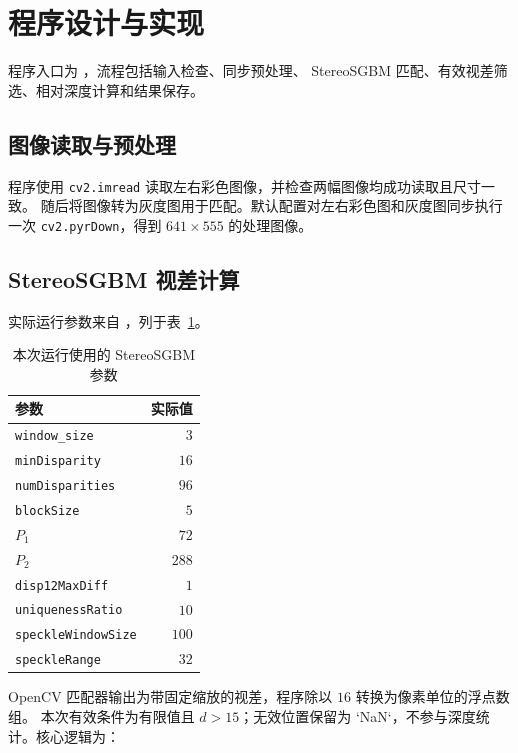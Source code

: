 \section{程序设计与实现}

程序入口为 ，流程包括输入检查、同步预处理、
StereoSGBM 匹配、有效视差筛选、相对深度计算和结果保存。

\subsection{图像读取与预处理}

程序使用 \texttt{cv2.imread} 读取左右彩色图像，并检查两幅图像均成功读取且尺寸一致。
随后将图像转为灰度图用于匹配。默认配置对左右彩色图和灰度图同步执行一次
\texttt{cv2.pyrDown}，得到 $641\times555$ 的处理图像。

\subsection{StereoSGBM 视差计算}

实际运行参数来自 ，列于表~\ref{tab:sgbm-params}。

\begin{table}[H]
  \centering
  \caption{本次运行使用的 StereoSGBM 参数}
  \label{tab:sgbm-params}
  \begin{tabular}{lr}
    \toprule
    参数 & 实际值 \\
    \midrule
    \texttt{window\_size} & $3$ \\
    \texttt{minDisparity} & $16$ \\
    \texttt{numDisparities} & $96$ \\
    \texttt{blockSize} & $5$ \\
    $P_1$ & $72$ \\
    $P_2$ & $288$ \\
    \texttt{disp12MaxDiff} & $1$ \\
    \texttt{uniquenessRatio} & $10$ \\
    \texttt{speckleWindowSize} & $100$ \\
    \texttt{speckleRange} & $32$ \\
    \bottomrule
  \end{tabular}
\end{table}

OpenCV 匹配器输出为带固定缩放的视差，程序除以 $16$ 转换为像素单位的浮点数组。
本次有效条件为有限值且 $d>15$；无效位置保留为 `NaN`，不参与深度统计。核心逻辑为：

